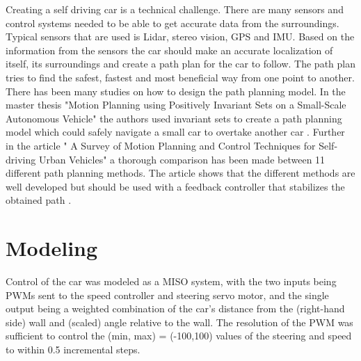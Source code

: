 \documentclass{LTHtwocol} %
\begin{document}
Creating a self driving car is a technical challenge. There are many sensors and control systems needed to be able to get accurate data from the surroundings. Typical sensors that are used is Lidar, stereo vision, GPS and IMU. Based on the information from the sensors the car should make an accurate localization of itself, its surroundings and create a path plan for the car to follow. The path plan tries to find the safest, fastest and most beneficial way from one point to another. There has been many studies on how to design the path planning model. In the master thesis "Motion Planning using Positively Invariant Sets on a Small-Scale Autonomous Vehicle" the authors used invariant sets to create a path planning model which could safely navigate a small car to overtake another car \cite{masterthesis}. Further in the article " A Survey of Motion Planning and Control Techniques for Self-driving Urban Vehicles" a thorough comparison has been made between 11 different path planning methods. The article  shows that the different methods are well developed but should be used with a feedback controller that stabilizes the obtained path \cite{motionPlanningArticle}.





\section{Modeling}


Control of the car was modeled as a MISO system, with the two inputs being PWMs sent to the speed controller and steering servo motor, and the single output being a weighted combination of the car's distance from the (right-hand side) wall and (scaled) angle relative to the wall. The resolution of the PWM was sufficient to control the (min, max) = (-100,100) values of the steering and speed to within 0.5 incremental steps.
\end{document}
